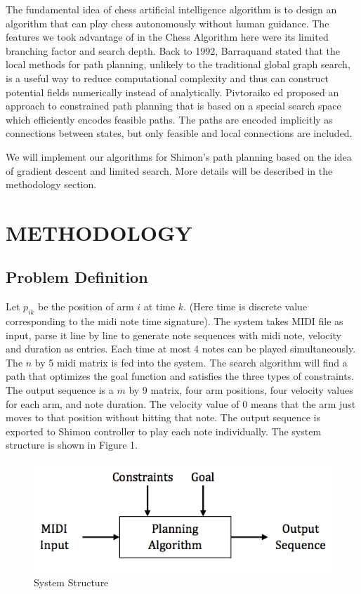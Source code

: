 \documentclass[letterpaper, 10 pt, conference]{ieeeconf}  %
\begin{document}
The fundamental idea of chess artificial intelligence algorithm is to design an algorithm that can play chess autonomously without human guidance. The features we took advantage of in the Chess Algorithm here were its limited branching factor and search depth.  Back to 1992, Barraquand \cite{BarLanLat92} stated that the local methods for path planning, unlikely to the traditional global graph search, is a useful way to reduce computational complexity and thus can construct potential fields numerically instead of analytically. Pivtoraiko ed \cite{PivKel05} proposed an approach to constrained path planning that is based on a special search space which efficiently encodes feasible paths. The paths are encoded implicitly as connections between states, but only feasible and local connections are included. 

We will implement our algorithms for Shimon's path planning based on the idea of gradient descent and limited search. More details will be described in the methodology section.

\section{METHODOLOGY}

\subsection{Problem Definition}

Let $p_{ik}$ be the position of arm $i$ at time $k$. (Here time is discrete value corresponding to the midi note time signature). The system takes MIDI file as input, parse it line by line to generate note sequences with midi note, velocity and duration as entries. Each time at most 4 notes can be played simultaneously. The $n$ by 5 midi matrix is fed into the system. The search algorithm will find a path that optimizes the goal function and satisfies the three types of constraints. The output sequence is a $m$ by 9 matrix, four arm positions, four velocity values for each arm, and note duration. The velocity value of 0 means that the arm just moves to that position without hitting that note. The output sequence is exported to Shimon controller to play each note individually. The system structure is shown in Figure 1.

\begin{figure}[h!]
\centering
\includegraphics[scale=0.4]{figure1.png}
\caption{System Structure}
\label{System}
\end{figure}
\end{document}
